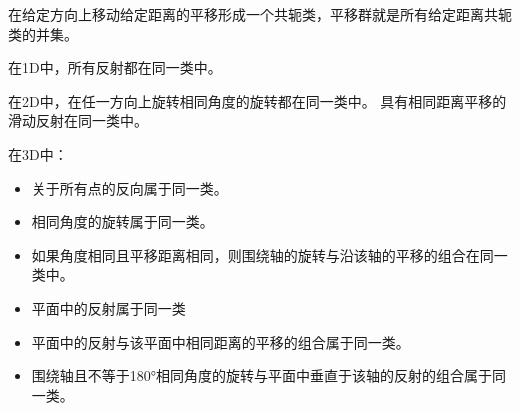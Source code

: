 在给定方向上移动给定距离的平移形成一个共轭类，平移群就是所有给定距离共轭类的并集。

在1D中，所有反射都在同一类中。

在2D中，在任一方向上旋转相同角度的旋转都在同一类中。 具有相同距离平移的滑动反射在同一类中。

在3D中：

\begin{itemize}
\item 关于所有点的反向属于同一类。
\item 相同角度的旋转属于同一类。
\item 如果角度相同且平移距离相同，则围绕轴的旋转与沿该轴的平移的组合在同一类中。
\item 平面中的反射属于同一类
\item 平面中的反射与该平面中相同距离的平移的组合属于同一类。
\item 围绕轴且不等于180°相同角度的旋转与平面中垂直于该轴的反射的组合属于同一类。
\end{itemize}


